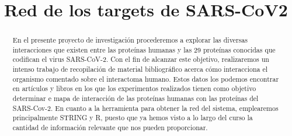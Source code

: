 \documentclass{bmcart}
\begin{document}
	\begin{frontmatter}
	
		\begin{fmbox}
			
		
			\title{Red de los targets de SARS-CoV2}
			
		
			\author[
			  addressref={aff1},                  
			  corref={aff1},                    
			  email={sandra091999@gmail.com}  
			]{ } 
			\author[
			  addressref={aff1},                 
			  corref={aff1},                      
			  email={fiorellapiriz@uma.es}    
			]{ } 
			\author[
			  addressref={aff1},                 
			  corref={aff1},                      
			  email={adrianseor.99@gmail.com}   
			]{ } 
		    \author[
			  addressref={aff1},                   
			  corref={aff1},                      
			  email={Rvalpalacios@gamil.com}  
			]{ }
			
	
			\address[id=aff1]{%
			  ,             
			  ,          
			  ,                              
			}
		
		\end{fmbox}
		
		\begin{abstractbox}
		
			\begin{abstract}
			En el presente proyecto de investigación procederemos a explorar las diversas interacciones que existen entre las proteínas humanas y las 29  proteínas conocidas que codifican el virus SARS-CoV-2. Con el fin de alcanzar este objetivo, realizaremos un intenso trabajo de recopilación de material bibliográfico acerca cómo interacciona el organismo comentado sobre el interactoma humano. Estos datos los podemos encontrar en artículos y libros en los que los experimentos realizados tienen como objetivo determinar e mapa de interacción de las proteínas humanas con las proteínas del SARS-Cov-2. En cuanto a la herramienta para obtener la red del sistema, emplearemos principalmente STRING y R, puesto que ya hemos visto a lo largo del curso la cantidad de información relevante que nos pueden proporcionar. 
	
			\end{abstract}
			
		
			\begin{keyword}
			\end{keyword}
		
		
		\end{abstractbox}
	
	\end{frontmatter}
	
\end{document}
